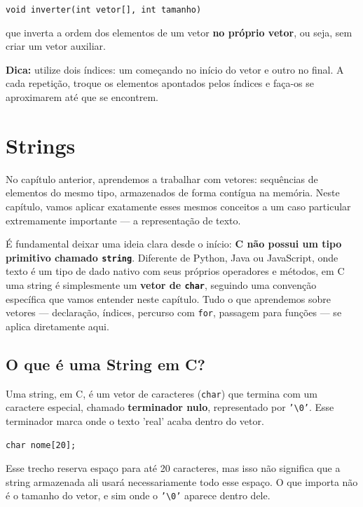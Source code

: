 \documentclass[12pt,a4paper,oneside]{extreport}
\begin{document}
\begin{center}
\texttt{void inverter(int vetor[], int tamanho)}
\end{center}

que inverta a ordem dos elementos de um vetor \textbf{no próprio vetor}, ou seja, sem criar um vetor auxiliar.

\textbf{Dica:} utilize dois índices: um começando no início do vetor e outro no final. A cada repetição, troque os elementos apontados pelos índices e faça-os se aproximarem até que se encontrem.


\chapter{Strings}
No capítulo anterior, aprendemos a trabalhar com vetores: sequências de elementos do mesmo tipo, armazenados de forma contígua na memória. Neste capítulo, vamos aplicar exatamente esses mesmos conceitos a um caso particular extremamente importante — a representação de texto.

É fundamental deixar uma ideia clara desde o início: \textbf{C não possui um tipo primitivo chamado \texttt{string}}. Diferente de Python, Java ou JavaScript, onde texto é um tipo de dado nativo com seus próprios operadores e métodos, em C uma string é simplesmente um \textbf{vetor de \texttt{char}}, seguindo uma convenção específica que vamos entender neste capítulo. Tudo o que aprendemos sobre vetores — declaração, índices, percurso com \texttt{for}, passagem para funções — se aplica diretamente aqui.

\section{O que é uma String em C?}

Uma string, em C, é um vetor de caracteres (\texttt{char}) que termina com um caractere especial, chamado \textbf{terminador nulo}, representado por \texttt{'\textbackslash 0'}. Esse terminador marca onde o texto 'real' acaba dentro do vetor.

\begin{lstlisting}
char nome[20];
\end{lstlisting}

Esse trecho reserva espaço para até 20 caracteres, mas isso não significa que a string armazenada ali usará necessariamente todo esse espaço. O que importa não é o tamanho do vetor, e sim onde o \texttt{'\textbackslash 0'} aparece dentro dele.
\end{document}
